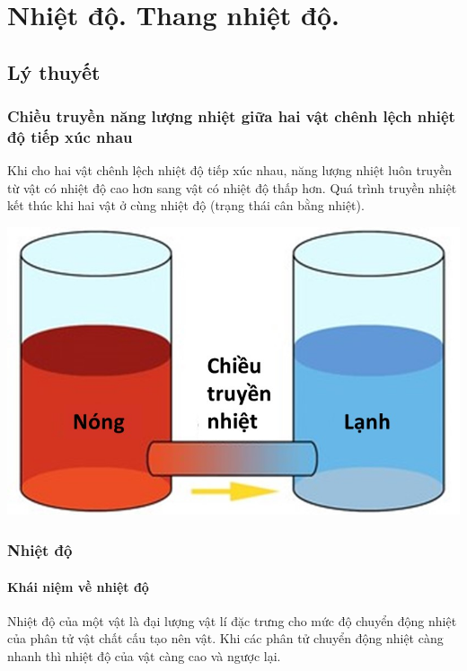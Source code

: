 \let\lesson\undefined
\newcommand{\lesson}{\phantomlesson{Bài 2: Nhiệt độ. Thang nhiệt độ}}
\chapter[Nhiệt độ. Thang nhiệt độ.]{Nhiệt độ. Thang nhiệt độ.}
\section{Lý thuyết}
\subsection{Chiều truyền năng lượng nhiệt giữa hai vật chênh lệch nhiệt độ tiếp xúc nhau}
Khi cho hai vật chênh lệch nhiệt độ tiếp xúc nhau, năng lượng nhiệt luôn truyền từ vật có nhiệt độ cao hơn sang vật có nhiệt độ thấp hơn. Quá trình truyền nhiệt kết thúc khi hai vật ở cùng nhiệt độ (trạng thái cân bằng nhiệt).
\begin{center}
	\includegraphics[width=0.3\linewidth]{../figs/VN12-Y24-PH-SYL-002-1}
\end{center}
\subsection{Nhiệt độ}
\subsubsection{Khái niệm về nhiệt độ}
Nhiệt độ của một vật là đại lượng vật lí đặc trưng cho mức độ chuyển động nhiệt của phân tử vật chất cấu tạo nên vật. Khi các phân tử chuyển động nhiệt càng nhanh thì nhiệt độ của vật càng cao và ngược lại.
